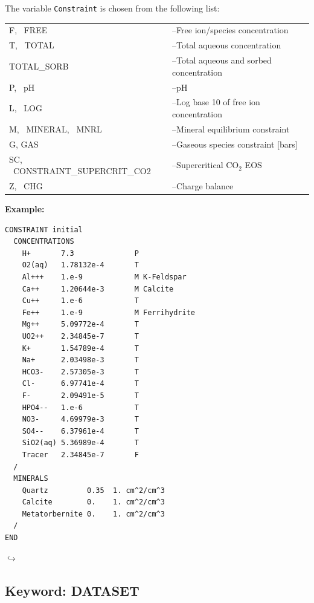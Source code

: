 \documentclass[12pt]{article}
\newcommand\return{{\hfill$\hookrightarrow$}}
\begin{document}

The variable {\tt Constraint} is chosen from the following list:


\begin{tabular}{ll}
F, \ FREE & --Free ion/species concentration\\
T, \ TOTAL & --Total aqueous concentration\\
TOTAL\_SORB & --Total aqueous and sorbed concentration\\
P, \ pH & --pH\\
L, \ LOG & --Log base 10 of free ion concentration\\
M, \ MINERAL, \ MNRL & --Mineral equilibrium constraint\\
G, GAS & --Gaseous species constraint [bars]\\
SC, \ CONSTRAINT\_SUPERCRIT\_CO2 & --Supercritical CO$_2$ EOS\\
Z, \ CHG & --Charge balance
\end{tabular}

\noindent
{\bf Example:}
\begin{verbatim}
CONSTRAINT initial
  CONCENTRATIONS
    H+       7.3              P
    O2(aq)   1.78132e-4       T
    Al+++    1.e-9            M K-Feldspar
    Ca++     1.20644e-3       M Calcite
    Cu++     1.e-6            T
    Fe++     1.e-9            M Ferrihydrite
    Mg++     5.09772e-4       T
    UO2++    2.34845e-7       T
    K+       1.54789e-4       T
    Na+      2.03498e-3       T
    HCO3-    2.57305e-3       T
    Cl-      6.97741e-4       T
    F-       2.09491e-5       T
    HPO4--   1.e-6            T
    NO3-     4.69979e-3       T
    SO4--    6.37961e-4       T
    SiO2(aq) 5.36989e-4       T
    Tracer   2.34845e-7       F
  /
  MINERALS
    Quartz         0.35  1. cm^2/cm^3
    Calcite        0.    1. cm^2/cm^3
    Metatorbernite 0.    1. cm^2/cm^3
  /
END
\end{verbatim}

\hyperlink{target_key}{\return}


\newpage
\protect\hypertarget{target_datset}{}

\subsection{Keyword: DATASET}
\end{document}
